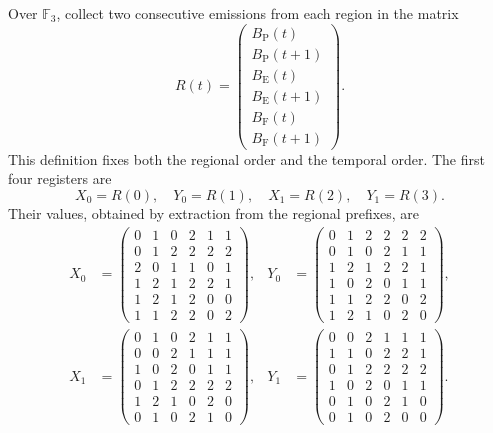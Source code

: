 Over \(\mathbb F_3\), collect two consecutive emissions from each region
in the matrix
\begin{equation}
 R(t)=
 \begin{pmatrix}
 B_{\mathrm P}(t)\\ B_{\mathrm P}(t+1)\\
 B_{\mathrm E}(t)\\ B_{\mathrm E}(t+1)\\
 B_{\mathrm F}(t)\\ B_{\mathrm F}(t+1)
 \end{pmatrix}.
 \label{act21:eq:df-registro-matricial}
\end{equation}
This definition fixes both the regional order and the temporal order.
The first four registers are
\[
 X_0=R(0),\quad Y_0=R(1),\quad X_1=R(2),\quad Y_1=R(3).
\]
Their values, obtained by extraction from the regional prefixes, are
\begin{align*}
 X_0&=\begin{pmatrix}
0&1&0&2&1&1\\0&1&2&2&2&2\\2&0&1&1&0&1\\
1&2&1&2&2&1\\1&2&1&2&0&0\\1&1&2&2&0&2
\end{pmatrix},&
 Y_0&=\begin{pmatrix}
0&1&2&2&2&2\\0&1&0&2&1&1\\1&2&1&2&2&1\\
1&0&2&0&1&1\\1&1&2&2&0&2\\1&2&1&0&2&0
\end{pmatrix},\\[1ex]
 X_1&=\begin{pmatrix}
0&1&0&2&1&1\\0&0&2&1&1&1\\1&0&2&0&1&1\\
0&1&2&2&2&2\\1&2&1&0&2&0\\0&1&0&2&1&0
\end{pmatrix},&
 Y_1&=\begin{pmatrix}
0&0&2&1&1&1\\1&1&0&2&2&1\\0&1&2&2&2&2\\
1&0&2&0&1&1\\0&1&0&2&1&0\\0&1&0&2&0&0
\end{pmatrix}.
\end{align*}

